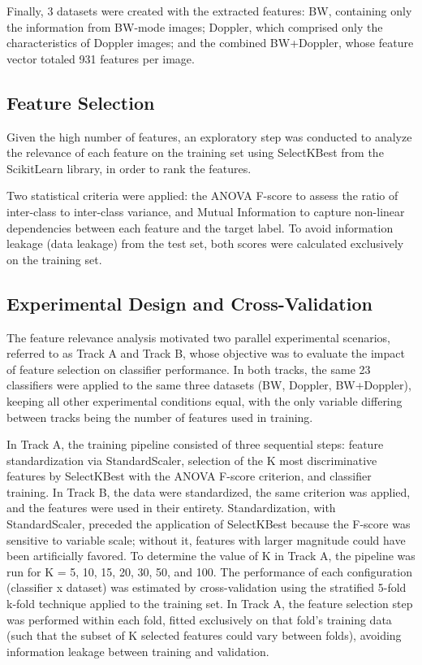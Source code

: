\documentclass[12pt,a4paper]{article}
\begin{document}
Finally, 3 datasets were created with the extracted features: BW, containing only the information from BW-mode images; Doppler, which comprised only the characteristics of Doppler images; and the combined BW+Doppler, whose feature vector totaled 931 features per image.

\subsection{Feature Selection}

Given the high number of features, an exploratory step was conducted to analyze the relevance of each feature on the training set using SelectKBest from the ScikitLearn library, in order to rank the features.

Two statistical criteria were applied: the ANOVA F-score to assess the ratio of inter-class to inter-class variance, and Mutual Information to capture non-linear dependencies between each feature and the target label. To avoid information leakage (data leakage) from the test set, both scores were calculated exclusively on the training set.

\subsection{Experimental Design and Cross-Validation}

The feature relevance analysis motivated two parallel experimental scenarios, referred to as Track A and Track B, whose objective was to evaluate the impact of feature selection on classifier performance. In both tracks, the same 23 classifiers were applied to the same three datasets (BW, Doppler, BW+Doppler), keeping all other experimental conditions equal, with the only variable differing between tracks being the number of features used in training.

In Track A, the training pipeline consisted of three sequential steps: feature standardization via StandardScaler, selection of the K most discriminative features by SelectKBest with the ANOVA F-score criterion, and classifier training. In Track B, the data were standardized, the same criterion was applied, and the features were used in their entirety. Standardization, with StandardScaler, preceded the application of SelectKBest because the F-score was sensitive to variable scale; without it, features with larger magnitude could have been artificially favored. To determine the value of K in Track A, the pipeline was run for K = 5, 10, 15, 20, 30, 50, and 100.
The performance of each configuration (classifier x dataset) was estimated by cross-validation using the stratified 5-fold k-fold technique applied to the training set. In Track A, the feature selection step was performed within each fold, fitted exclusively on that fold's training data (such that the subset of K selected features could vary between folds), avoiding information leakage between training and validation.
\end{document}
